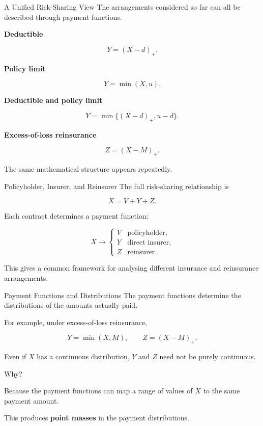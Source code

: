 \documentclass[
  ignorenonframetext,
  aspectratio=169,
]{beamer}
\begin{document}
\begin{frame}{A Unified Risk-Sharing View}
\protect{}\label{a-unified-risk-sharing-view}
The arrangements considered so far can all be described through payment
functions.

\textbf{Deductible}

\[
Y=(X-d)_+.
\]

\textbf{Policy limit}

\[
Y=\min(X,u).
\]

\textbf{Deductible and policy limit}

\[
Y=\min\{(X-d)_+,u-d\}.
\]

\textbf{Excess-of-loss reinsurance}

\[
Z=(X-M)_+.
\]

The same mathematical structure appears repeatedly.
\end{frame}

\begin{frame}{Policyholder, Insurer, and Reinsurer}
\protect{}\label{policyholder-insurer-and-reinsurer}
The full risk-sharing relationship is

\[
\boxed{X=V+Y+Z}.
\]

Each contract determines a payment function:

\[
X
\longrightarrow
\begin{cases}
V & \text{policyholder},\\
Y & \text{direct insurer},\\
Z & \text{reinsurer}.
\end{cases}
\]

This gives a common framework for analysing different insurance and
reinsurance arrangements.
\end{frame}

\begin{frame}{Payment Functions and Distributions}
\protect{}\label{payment-functions-and-distributions}
The payment functions determine the distributions of the amounts
actually paid.

For example, under excess-of-loss reinsurance,

\[
Y=\min(X,M),
\qquad
Z=(X-M)_+.
\]

Even if \(X\) has a continuous distribution, \(Y\) and \(Z\) need not be
purely continuous.

Why?

Because the payment functions can map a range of values of \(X\) to the
same payment amount.

This produces \textbf{point masses} in the payment distributions.
\end{frame}
\end{document}
